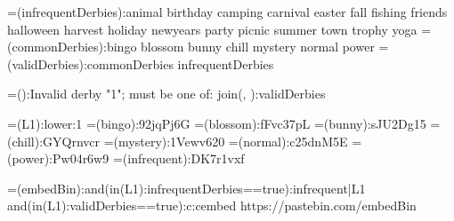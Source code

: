 {=(infrequentDerbies):animal birthday camping carnival easter fall fishing friends halloween harvest holiday newyears party picnic summer town trophy yoga}
{=(commonDerbies):bingo blossom bunny chill mystery normal power}
{=(validDerbies):{commonDerbies} {infrequentDerbies}}

{=():Invalid derby "{1}"; must be one of: {join(, ):{validDerbies}}}

{=(L1):{lower:{1}}}
{=(bingo):92jqPj6G}
{=(blossom):fFvc37pL}
{=(bunny):sJU2Dg15}
{=(chill):GYQrnvcr}
{=(mystery):1Vewv620}
{=(normal):c25dnM5E}
{=(power):Pw04r6w9}
{=(infrequent):DK7r1vxf}


{=(embedBin):{{and({in({L1}):{infrequentDerbies}}==true):infrequent|{L1}}}}
{{and({in({L1}):{validDerbies}}==true):c:cembed https://pastebin.com/{embedBin}}}
